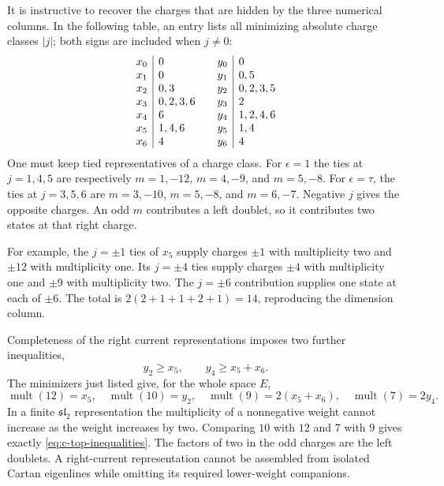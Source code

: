 It is instructive to recover the charges that are hidden by the
three numerical columns. In the following table, an entry lists all
minimizing absolute charge classes $|j|$; both signs are included
when $j\ne0$:
\[
\begin{array}{c|l@{\qquad}c|l}
x_0&0&y_0&0\\
x_1&0&y_1&0,5\\
x_2&0,3&y_2&0,2,3,5\\
x_3&0,2,3,6&y_3&2\\
x_4&6&y_4&1,2,4,6\\
x_5&1,4,6&y_5&1,4\\
x_6&4&y_6&4
\end{array}
\]
One must keep tied representatives of a charge class. For
$\epsilon=1$ the ties at $j=1,4,5$ are respectively
$m=1,-12$, $m=4,-9$, and $m=5,-8$. For $\epsilon=\tau$,
the ties at $j=3,5,6$ are $m=3,-10$, $m=5,-8$, and $m=6,-7$.
Negative $j$ gives the opposite charges. An odd $m$ contributes
a left doublet, so it contributes two states at that right charge.

For example, the $j=\pm1$ ties of $x_5$ supply charges
$\pm1$ with multiplicity two and $\pm12$ with multiplicity one.
Its $j=\pm4$ ties supply charges $\pm4$ with multiplicity one
and $\pm9$ with multiplicity two. The $j=\pm6$ contribution
supplies one state at each of $\pm6$. The total is
$2(2+1+1+2+1)=14$, reproducing the dimension column.

Completeness of the right current representations imposes two further
inequalities,
\begin{equation}\label{eq:c-top-inequalities}
 y_2\geq x_5,\qquad y_4\geq x_5+x_6.
\end{equation}
The minimizers just listed give, for the whole space $E$,
\[
 \operatorname{mult}(12)=x_5,\quad
 \operatorname{mult}(10)=y_2,\quad
 \operatorname{mult}(9)=2(x_5+x_6),\quad
 \operatorname{mult}(7)=2y_4.
\]
In a finite $\mathfrak{sl}_2$ representation the multiplicity of
a nonnegative weight cannot increase as the weight increases by
two. Comparing $10$ with $12$ and $7$ with $9$ gives exactly
\eqref{eq:c-top-inequalities}. The factors of two in the odd
charges are the left doublets. A right-current representation cannot
be assembled from isolated Cartan eigenlines while omitting its
required lower-weight companions.

